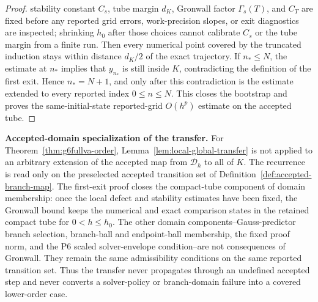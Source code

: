 \documentclass[preprint,12pt]{elsarticle}
\begin{document}
\begin{proof}
stability constant \(C_s\), tube margin \(d_K\), Gronwall factor
\(\Gamma_s(T)\), and \(C_T\) are fixed before any reported grid errors,
work-precision slopes, or exit diagnostics are inspected; shrinking \(h_0\)
after those choices cannot calibrate \(C_s\) or the tube margin from a
finite run.
Then every numerical point covered by the truncated induction stays within
distance \(d_K/2\) of the exact trajectory.  If \(n_\ast\le N\), the estimate
at \(n_\ast\) implies that \(y_{n_\ast}\) is still inside \(K\), contradicting
the definition of the first exit.  Hence \(n_\ast=N+1\), and only after this
contradiction is the estimate extended to every reported index
\(0\le n\le N\). This closes the bootstrap and proves the same-initial-state
reported-grid \(O(h^p)\) estimate on the accepted tube.
\end{proof}

\noindent\textbf{Accepted-domain specialization of the transfer.}
For Theorem~\ref{thm:g6fullva-order}, Lemma~\ref{lem:local-global-transfer}
is not applied to an arbitrary extension of the accepted map from
\(\mathcal D_h\) to all of \(K\).  The recurrence is read only on the
preselected accepted transition set of
Definition~\ref{def:accepted-branch-map}.  The first-exit proof closes the
compact-tube component of domain membership: once the local defect and
stability estimates have been fixed, the Gronwall bound keeps the numerical
and exact comparison states in the retained compact tube for \(0<h\le h_0\).
The other domain components--Gauss-predictor branch selection, branch-ball and
endpoint-ball membership, the fixed proof norm, and the P6 scaled
solver-envelope condition--are not consequences of Gronwall.  They remain the
same admissibility conditions on the same reported transition set.
Thus the transfer never propagates through an undefined accepted step and
never converts a solver-policy or branch-domain failure into a covered
lower-order case.
\end{document}
